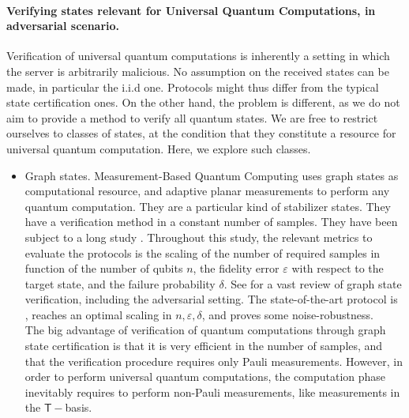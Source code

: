 \documentclass[11pt]{article}
\newcommand{\T}{\mathsf{T}}
\begin{document}
\paragraph{Verifying states relevant for Universal Quantum Computations, in adversarial scenario.} Verification of universal quantum computations is inherently a setting in which the server is arbitrarily malicious. No assumption on the received states can be made, in particular the i.i.d one. Protocols might thus differ from the typical state certification ones. On the other hand, the problem is different, as we do not aim to provide a method to verify all quantum states. We are free to restrict ourselves to classes of states, at the condition that they constitute a resource for universal quantum computation. Here, we explore such classes. 
\begin{itemize}
    \item Graph states. Measurement-Based Quantum Computing uses graph states as computational resource, and adaptive planar measurements to perform any quantum computation.
     They are a particular kind of stabilizer states. They have a verification method in a constant number of samples. They have been subject to a long study \cite{HM15verifiable,ZH19efficient,TMMM18resource,TM17verification}. Throughout this study, the relevant metrics to evaluate the protocols is the scaling of the number of required samples in function of the number of qubits $n$, the fidelity error $\varepsilon$ with respect to the target state, and the failure probability $\delta$. See \cite[Fig.2, Supplementary note 3]{LZH23robust} for a vast review of graph state verification, including the adversarial setting. The state-of-the-art protocol is \cite{LZH23robust}, reaches an optimal scaling in $n, \varepsilon, \delta$, and proves some noise-robustness.\\
    
    The big advantage of verification of quantum computations through graph state certification is that it is very efficient in the number of samples, and that the verification procedure requires only Pauli measurements. However, in order to perform universal quantum computations, the computation phase inevitably requires to perform non-Pauli measurements, like measurements in the $\T-$basis.


\end{itemize}
\end{document}
